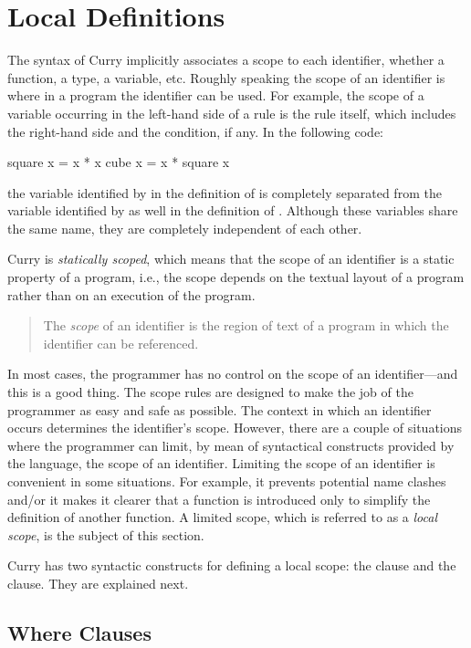 \section{Local Definitions}

The syntax of Curry implicitly associates a scope
to each identifier, whether a function, a type, a variable, etc.
Roughly speaking the scope of an identifier is where in a program
the identifier can be used.
For example, the scope of a variable occurring in the left-hand side
of a rule is the rule itself, which includes the right-hand side
and the condition, if any.
In the following code:
%
\begin{prog}
square x = x * x
\medskip
cube   x = x * square x
\end{prog}
%
the variable identified by  in the definition of 
is completely separated from the variable 
identified by  as well in the definition of .
Although these variables share the same name, they
are completely independent of each other.

Curry is \emph{statically scoped},
which means that the scope of an
identifier is a static property of a program, i.e.,
the scope depends on the textual layout of a program rather than on
an execution of the program.
%
\begin{quote}
The \emph{scope} of an identifier is the region of text
of a program in which the identifier can be referenced.
\end{quote}
%
In most cases, the programmer has no control on the scope of
an identifier---and this is a good thing.
The scope rules are designed to make the job of the programmer
as easy and safe as possible.
The context in which an identifier occurs determines the
identifier's scope.
However, there are a couple of situations where the programmer
can limit, by mean of syntactical constructs provided by the language,
the scope of an identifier.
Limiting the scope of an identifier is convenient in some situations.
For example, it prevents potential name clashes
and/or it makes it clearer that a function is
introduced only to simplify the definition of another function.
A limited scope,
which is referred to as a \emph{local scope},
is the subject of this section.

Curry has two syntactic constructs 
for defining a local scope: the  clause
and the  clause.
They are explained next.

\subsection{{\selectfont Where} Clauses}
\label{where-clause}

